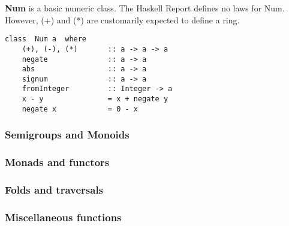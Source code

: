 \textbf{Num} is a basic numeric class.
The Haskell Report defines no laws for Num.
However, (+) and (*) are customarily expected to define a ring.
\begin{verbatim}
class  Num a  where
    (+), (-), (*)       :: a -> a -> a
    negate              :: a -> a
    abs                 :: a -> a
    signum              :: a -> a
    fromInteger         :: Integer -> a
    x - y               = x + negate y
    negate x            = 0 - x
\end{verbatim}


\subsubsection{Semigroups and Monoids}

\subsubsection{Monads and functors}

\subsubsection{Folds and traversals}

\subsubsection{Miscellaneous functions}

%
